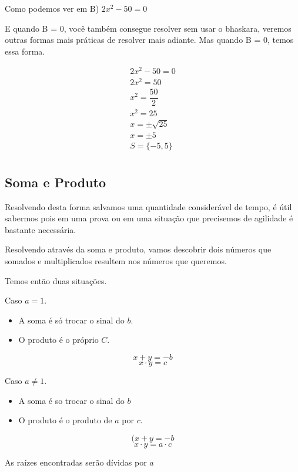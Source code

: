 \documentclass[letterpaper]{book}
\begin{document}
Como podemos ver em B) \(2x^{2} - 50 = 0\)

E quando B = 0, você também consegue resolver sem usar o bhaskara, veremos outras formas mais práticas de resolver mais adiante. Mas quando B = 0, temos essa forma.

\vspace{0.5em}

\begin{align*}
2x^{2} - 50 = 0 \\
2x^{2} = 50 \\
x^{2} = \dfrac{50}{2} \\
x^{2} = 25 \\
x = \pm \sqrt{25} \\
x = \pm 5 \\
S = \{-5, 5\} \\
\end{align*}

\subsection{Soma e Produto}

Resolvendo desta forma salvamos uma quantidade considerável de tempo, é útil sabermos pois em uma prova ou em uma situação que precisemos de agilidade é bastante necessária.

Resolvendo através da soma e produto, vamos descobrir dois números que somados e multiplicados resultem nos números que queremos.

Temos então duas situações.

Caso \(a = 1\).

\begin{itemize}
\item A soma é só trocar o sinal do \(b\).
\item O produto é o próprio \(C\).
\end{itemize}

\[x + y = -b\]
\[x \cdot y = c\]

Caso \(a \neq 1\).

\begin{itemize}
\item A soma é so trocar o sinal do \(b\)
\item O produto é o produto de \(a\) por \(c\).
\end{itemize}

\[(x + y = -b\]
\[x \cdot y = a \cdot c\]

As raízes encontradas serão dívidas por \(a\)
\end{document}
